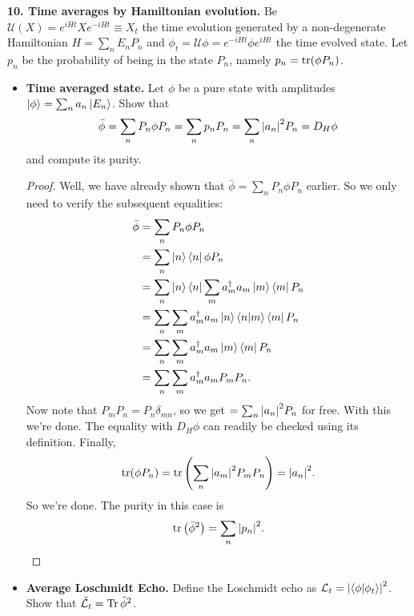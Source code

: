 \documentclass{book}
\theoremstyle{definition}
\newcommand{\lag}{\mathcal{L}}
\newcommand{\nn}{\nonumber}
\newcommand{\lp}{\left(}
\newcommand{\rp}{\right)}
\begin{document}
\noindent \textbf{10. Time averages by Hamiltonian evolution.} Be $\mathcal{U}(X) = e^{iHt} X e^{-iHt} \equiv X_t$ the time evolution generated by a non-degenerate Hamiltonian $H = \sum_n E_n P_n$ and $\phi_t = \mathcal{U}\phi = e^{-iHt}\phi e^{iHt}$ the time evolved state. Let $p_n$ be the probability of being in the state $P_n$, namely $p_n = \tr(\phi P_n)$. 

\begin{itemize}
	\item \textbf{Time averaged state.} Let $\phi$ be a pure state with amplitudes $\ket{\phi} = \sum_n a_n \ket{E_n}$. Show that   
	\begin{align}
	\bar{\phi} = \sum_n P_n \phi P_n = \sum_n p_n P_n = \sum_n \abs{a_n}^2 P_n = D_H \phi
	\end{align}
	and compute its purity. 
	
	\begin{proof}
		 Well, we have already shown that $\bar{\phi} = \sum_n P_n \phi P_n$ earlier. So we only need to verify the subsequent equalities:
		 \begin{align}
		 \bar\phi &= \sum_n P_n \phi P_n \nn\\
		 &= \sum_n \ket{n}\bra{n}\phi P_n\nn\\
		 &= \sum_n \ket{n} \bra{n}\sum_m a_m^\dagger a_m \ket{m}\bra{m} P_n\nn\\
		 &=  \sum_n  \sum_m a_m^\dagger a_m \ket{n} \braket{n}{m}\bra{m} P_n\nn\\
		 &= \sum_n  \sum_m a_m^\dagger a_m \ket{m} \bra{m} P_n\nn\\
		 &= \sum_n  \sum_m a_m^\dagger a_m P_m P_n.
		 \end{align}
		 Now note that $P_m P_n = P_n \delta_{mn}$, so we get $=\sum_n \abs{a_n}^2P_n$ for free. With this we're done. The equality with $D_H \phi$ can readily be checked using its definition. Finally,
		 \begin{align}
		 \tr(\phi P_n) = \tr\lp \sum_n \abs{a_m}^2 P_m  P_n \rp =  \abs{a_n}^2.
		 \end{align}
		 So we're done. The purity in this case is 
		 \begin{align}
		 \tr\lp \bar{\phi}^2 \rp = \sum_n \abs{p_n}^2.
		 \end{align}
	\end{proof}
	
	
	
	\item \textbf{Average Loschmidt Echo.} Define the Loschmidt echo as $\lag_t = \abs{\braket{\phi}{\phi_t}}^2$. Show that $\bar{\lag_t} = \Tr \bar{\phi}^2$.
	

\end{itemize}
\end{document}
